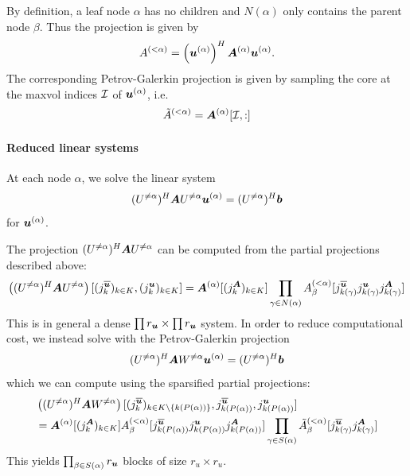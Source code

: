 \documentclass[a4wide]{article}
\begin{document}
By definition, a leaf node $\alpha$ has no children and $N(\alpha)$ only contains the parent node $\beta$.
Thus the projection is given by
\begin{equation*}
  A^{(<\alpha)}
  = \left( {\boldsymbol{u}}^{(\alpha)} \right)^H {\boldsymbol{A}}^{(\alpha)}   {\boldsymbol{u}}^{(\alpha)}.
\end{equation*} 
The corresponding Petrov-Galerkin projection is given by sampling the core at the maxvol indices $\mathcal{I}$ of $ {\boldsymbol{u}}^{(\alpha)}$, i.e.
\begin{equation*}
  \tilde{A}^{(<\alpha)}
  = {\boldsymbol{A}}^{(\alpha)}[\mathcal{I}, :]
\end{equation*} 

\paragraph{Reduced linear systems}

At each node $\alpha$, we solve the linear system
\begin{equation*}
  (U^{\neq \alpha})^H {\boldsymbol{A}} U^{\neq \alpha} {\boldsymbol{u}}^{(\alpha)} = (U^{\neq \alpha})^H {\boldsymbol{b}}
\end{equation*}
for ${\boldsymbol{u}}^{(\alpha)}$.

The projection $(U^{\neq \alpha})^H {\boldsymbol{A}} U^{\neq \alpha}$ can be computed from the partial projections described above:
\begin{align*}
  \left( (U^{\neq \alpha})^H {\boldsymbol{A}} U^{\neq \alpha}\right)[(j^{\overline{{\boldsymbol{u}}}}_k)_{k \in K}, (j^{{\boldsymbol{u}}}_k)_{k \in K}]
  = {\boldsymbol{A}}^{(\alpha)}[(j^{{\boldsymbol{A}}}_k)_{k \in K}] \prod_{\gamma \in N(\alpha)} A^{(<\alpha)}_\beta[j^{\overline{{\boldsymbol{u}}}}_{k(\gamma)} j^{{\boldsymbol{u}}}_{k(\gamma)} j^{{\boldsymbol{A}}}_{k(\gamma)}]
\end{align*}
This is in general a dense $\prod r_{\boldsymbol{u}} \times \prod r_{\boldsymbol{u}}$ system.
In order to reduce computational cost, we instead solve with the Petrov-Galerkin projection
\begin{equation}
  \label{eq:reduced_system}
  (U^{\neq \alpha})^H {\boldsymbol{A}} W^{\neq \alpha} {\boldsymbol{u}}^{(\alpha)} = (U^{\neq \alpha})^H {\boldsymbol{b}}
\end{equation}
which we can compute using the sparsified partial projections:
\begin{align*}
  &\left( (U^{\neq \alpha})^H {\boldsymbol{A}} W^{\neq \alpha}\right)[(j^{\overline{{\boldsymbol{u}}}}_k)_{k \in K \setminus \{k(P(\alpha))\}}, j^{\overline{{\boldsymbol{u}}}}_{k(P(\alpha))}, j^{{\boldsymbol{u}}}_{k(P(\alpha))}] \\ 
  &= {\boldsymbol{A}}^{(\alpha)}[(j^{{\boldsymbol{A}}}_k)_{k \in K}]  
  A^{(<\alpha)}_\beta
  [j^{\overline{{\boldsymbol{u}}}}_{k(P(\alpha))} j^{{\boldsymbol{u}}}_{k(P(\alpha))} j^{{\boldsymbol{A}}}_{k(P(\alpha))}]
  \prod_{\gamma \in S(\alpha)} \tilde{A}^{(<\alpha)}_\beta 
  [j^{\overline{{\boldsymbol{u}}}}_{k(\gamma)} j^{{\boldsymbol{A}}}_{k(\gamma)}]
\end{align*}
This yields $\prod_{\beta \in S(\alpha)} r_{\boldsymbol{u}}$ blocks of size $r_u \times r_u$. 
\end{document}
